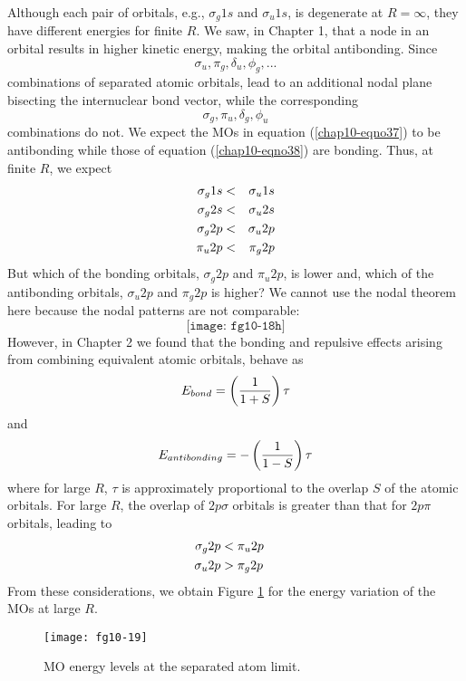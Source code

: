 Although each pair of orbitals, e.g., $\sigma_g 1s$ and $\sigma_u 1s$, 
is degenerate at $R = \infty$, they have different energies for finite 
$R$. We saw, in Chapter 1,
that a node in an orbital results in higher kinetic energy, making the orbital
antibonding. Since
\begin{equation}
\sigma_u , \pi_g , \delta_u , \phi_g , . . . 
\label{chap10-eqno37}
\end{equation}
combinations of separated atomic orbitals, lead to an additional nodal plane
bisecting the internuclear bond vector, while the corresponding
\begin{equation}
\sigma_g , \pi_u , \delta_g , \phi_u
\label{chap10-eqno38}
\end{equation}
combinations do not.  We expect the MOs in equation
(\ref{chap10-eqno37}) to be antibonding while those of equation
(\ref{chap10-eqno38}) are bonding.  Thus, at finite $R$, we expect
\begin{eqnarray}
\sigma_g 1s & < &\sigma_u 1s\cr
\sigma_g 2s & < &\sigma_u 2s\cr
\sigma_g 2p & < &\sigma_u 2p\cr
\pi_u 2p & < &\pi_g 2p
\end{eqnarray}
But which of the bonding orbitals, $\sigma_g 2p$ and $\pi_u 2p$, is 
lower and, which of the antibonding orbitals, $\sigma_u 2p$ and 
$\pi_g 2p$ is higher?  We cannot use the nodal theorem here because 
the nodal patterns are not comparable:
\begin{equation}
\texttt{[image: fg10-18h]}
\end{equation}
However, in Chapter 2 we found that the bonding and repulsive effects 
arising from combining equivalent atomic orbitals, behave as
\begin{equation}
E_{bond} = \left( {1 \over 1 + S} \right) \tau
\end{equation}
and
\begin{equation}
E_{antibonding} = - \left( {1 \over 1 - S} \right) \tau
\end{equation}
where for large $R$, $\tau$ is approximately proportional to the 
overlap $S$
of the atomic orbitals.  For large $R$, the overlap of $2p \sigma$ orbitals is 
greater than that for $2p \pi$ orbitals, leading to
\begin{eqnarray}
\sigma_g 2p & < \pi_u 2p\cr
\sigma_u 2p & > \pi_g 2p
\end{eqnarray}
From these considerations, we obtain Figure \ref{chap10-fig19} for the
energy variation of the MOs at large $R$.


\begin{figure}
\texttt{[image: fg10-19]}
\caption{MO energy levels at the separated atom limit.}
\label{chap10-fig19}
\end{figure}


